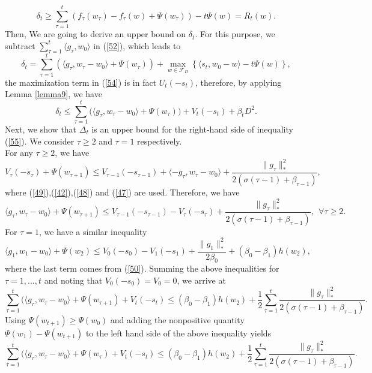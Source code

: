 \begin{equation}\label{53}
	\delta_t \geq \sum_{\tau=1}^{t} \left(f_{\tau}(w_{\tau}) - f_{\tau}(w) + \Psi(w_{\tau})\right) -t \Psi(w) = R_t(w).	
\end{equation}
Then, We are going to derive an upper bound on $\delta_t$. For this purpose, we subtract $\sum_{\tau=1}^{t} \langle g_{\tau},w_0 \rangle$ in (\ref{52}), which leads to 
\begin{equation}\label{54}
	\delta_t = \sum\limits_{\tau=1}^{t} \left( \langle g_{\tau},w_{\tau}-w_0 \rangle  + \Psi(w_{\tau})\right) +
	\max\limits_{w\in \mathcal{F}_D} \left\{ \langle s_t,w_0 -w \rangle  - t \Psi(w) \right\},
\end{equation}
the maximization term in (\ref{54}) is in fact $U_t(-s_t)$, therefore, by applying Lemma \ref{lemma9}, we have
\begin{equation}\label{55}
	\delta_t\leq \sum\limits_{\tau=1}^{t} \big( \langle g_{\tau},w_{\tau}-w_0 \rangle  + \Psi(w_{\tau})\big) +V_t(-s_t)+\beta_t D^2.
\end{equation}
Next, we show that $\Delta_t$ is an upper bound for the right-hand side of inequality (\ref{55}). We consider $\tau \geq 2$ and $\tau =1$ respectively.\\
For any $\tau \geq 2$, we have
$$
V_{\tau}(-s_{\tau})+\Psi(w_{\tau+1})\leq V_{\tau-1}(-s_{\tau-1})+\langle-g_{\tau},w_{\tau}-w_0\rangle+\frac{\|g_{\tau}\|^2_{\ast}}{2(\sigma(\tau-1)+\beta_{\tau -1})},
$$
where (\ref{49}),(\ref{42}),(\ref{48}) and (\ref{47}) are used. Therefore, we have
$$
\langle g_{\tau},w_{\tau}-w_0\rangle +\Psi(w_{\tau+1})\leq 
V_{\tau-1}(-s_{\tau-1}) - V_{\tau}(-s_{\tau}) + \frac{\|g_{\tau}\|^2_{\ast}}{2(\sigma(\tau-1)+\beta_{\tau -1})},~~\forall\tau\geq 2.
$$
For $\tau =1$, we have a similar inequality
$$
\langle g_{1},w_1-w_0\rangle +\Psi(w_2)\leq 
V_{0}(-s_{0}) - V_{1}(-s_{1}) + \frac{\|g_{1}\|^2_{\ast}}{2\beta_0} +(\beta_0-\beta_1)h(w_2),
$$
where the last term comes from (\ref{50}). Summing the above inequalities for $\tau=1,...,t$ and noting that $V_0(-s_0)=V_0=0$, we arrive at
$$
\sum\limits_{\tau=1}^{t} \big( \langle g_{\tau},w_{\tau}-w_0 \rangle  + \Psi(w_{\tau+1}) +V_t(-s_t) \leq
(\beta_0-\beta_1)h(w_2)+\frac{1}{2} \sum\limits_{\tau=1}^{t}  \frac{\|g_{\tau}\|^2_{\ast}}{2(\sigma(\tau-1)+\beta_{\tau -1})}.
$$ 
Using $\Psi(w_{t+1})\geq \Psi(w_0)$ and adding the nonpositive quantity $\Psi(w_1)-\Psi(w_{t+1})$ to the left hand side of the above inequality yields
\begin{equation}\label{56}
	\sum\limits_{\tau=1}^{t} \big( \langle g_{\tau},w_{\tau}-w_0 \rangle  + \Psi(w_{\tau}) +V_t(-s_t) \leq
	(\beta_0-\beta_1)h(w_2)+\frac{1}{2} \sum\limits_{\tau=1}^{t}  \frac{\|g_{\tau}\|^2_{\ast}}{2(\sigma(\tau-1)+\beta_{\tau -1})}.
\end{equation}
